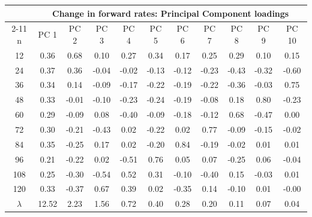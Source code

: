 \begin{tabular}{ccccccccccc}
\hline &\multicolumn{10}{c}{Change in forward rates: Principal Component loadings} \\ \cline{2-11}
 n	&	PC 1	&	PC 2	&	PC 3	&	PC 4	&	PC 5	&	PC 6	&	PC 7	&	PC 8	&	PC 9	&	PC 10\\
 		\hline
12 & 0.36 & 0.68 & 0.10 & 0.27 & 0.34 & 0.17 & 0.25 & 0.29 & 0.10 & 0.15 \\
24 & 0.37 & 0.36 & -0.04 & -0.02 & -0.13 & -0.12 & -0.23 & -0.43 & -0.32 & -0.60 \\
36 & 0.34 & 0.14 & -0.09 & -0.17 & -0.22 & -0.19 & -0.22 & -0.36 & -0.03 & 0.75 \\
48 & 0.33 & -0.01 & -0.10 & -0.23 & -0.24 & -0.19 & -0.08 & 0.18 & 0.80 & -0.23 \\
60 & 0.29 & -0.09 & 0.08 & -0.40 & -0.09 & -0.18 & -0.12 & 0.68 & -0.47 & 0.00 \\
72 & 0.30 & -0.21 & -0.43 & 0.02 & -0.22 & 0.02 & 0.77 & -0.09 & -0.15 & -0.02 \\
84 & 0.35 & -0.25 & 0.17 & 0.02 & -0.20 & 0.84 & -0.19 & -0.02 & 0.01 & 0.01 \\
96 & 0.21 & -0.22 & 0.02 & -0.51 & 0.76 & 0.05 & 0.07 & -0.25 & 0.06 & -0.04 \\
108 & 0.25 & -0.30 & -0.54 & 0.52 & 0.31 & -0.10 & -0.40 & 0.15 & -0.03 & 0.01 \\
120 & 0.33 & -0.37 & 0.67 & 0.39 & 0.02 & -0.35 & 0.14 & -0.10 & 0.01 & -0.00 \\
		\hline
$\lambda$ & 12.52 & 2.23 & 1.56 & 0.72 & 0.40 & 0.28 & 0.20 & 0.11 & 0.07 & 0.04 \\
\hline
    \end{tabular}
